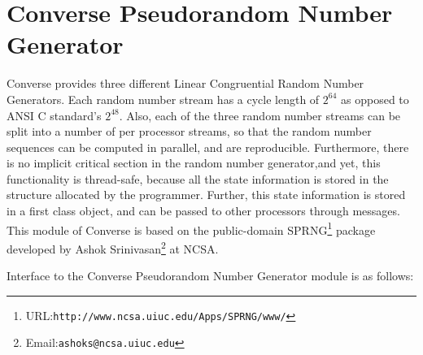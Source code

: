 \chapter{Converse Pseudorandom Number Generator}

Converse provides three different Linear Congruential Random Number Generators.
Each random number stream has a cycle length of $2^{64}$ as opposed to
ANSI C standard's $2^{48}$.
Also, each of the three random number streams can be split into a number of
per processor streams, so that the random number sequences can be computed 
in parallel, and are reproducible. Furthermore, there is no implicit critical
section in the random number generator,and yet, this functionality is
thread-safe, because all the state information is stored in the structure
allocated by the programmer. Further, this state information is stored in a
first class object, and can be passed to other processors through messages.
This module of Converse is based on the public-domain 
SPRNG\footnote{URL:{\tt http://www.ncsa.uiuc.edu/Apps/SPRNG/www/}} 
package developed
by Ashok Srinivasan\footnote{Email:{\tt ashoks@ncsa.uiuc.edu}} at NCSA.

Interface to the Converse Pseudorandom Number Generator module is as follows:





\desc{}


